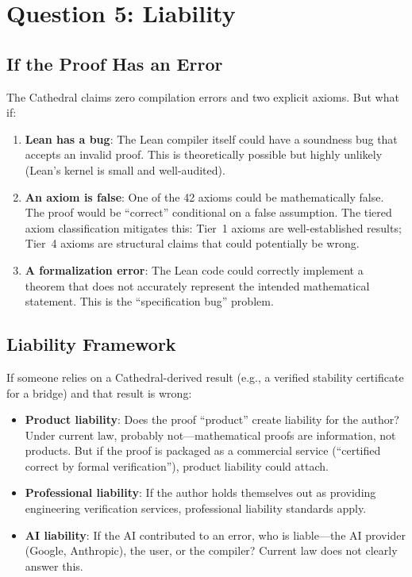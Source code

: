 \documentclass[11pt,a4paper]{article}
\begin{document}
\section{Question 5: Liability}
\label{sec:liability}

\subsection{If the Proof Has an Error}

The Cathedral claims zero compilation errors and two explicit
axioms. But what if:

\begin{enumerate}
  \item \textbf{Lean has a bug}: The Lean compiler itself could
    have a soundness bug that accepts an invalid proof. This is
    theoretically possible but highly unlikely (Lean's kernel is
    small and well-audited).

  \item \textbf{An axiom is false}: One of the 42 axioms could be
    mathematically false. The proof would be ``correct'' conditional
    on a false assumption. The tiered axiom classification mitigates
    this: Tier~1 axioms are well-established results; Tier~4 axioms
    are structural claims that could potentially be wrong.

  \item \textbf{A formalization error}: The Lean code could
    correctly implement a theorem that does not accurately represent
    the intended mathematical statement. This is the ``specification
    bug'' problem.
\end{enumerate}

\subsection{Liability Framework}

If someone relies on a Cathedral-derived result (e.g., a verified
stability certificate for a bridge) and that result is wrong:

\begin{itemize}
  \item \textbf{Product liability}: Does the proof ``product''
    create liability for the author? Under current law, probably
    not---mathematical proofs are information, not products. But
    if the proof is packaged as a commercial service (``certified
    correct by formal verification''), product liability could
    attach.

  \item \textbf{Professional liability}: If the author holds
    themselves out as providing engineering verification services,
    professional liability standards apply.

  \item \textbf{AI liability}: If the AI contributed to an error,
    who is liable---the AI provider (Google, Anthropic), the user,
    or the compiler? Current law does not clearly answer this.
\end{itemize}
\end{document}

